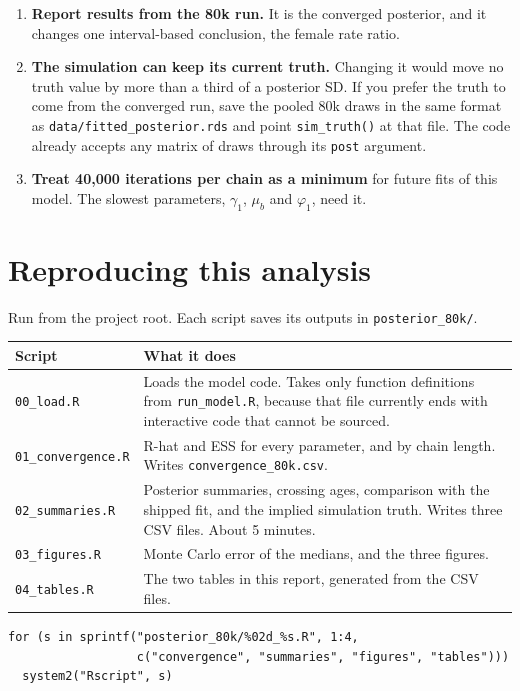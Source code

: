 \documentclass[11pt]{article}
\newcommand{\code}[1]{\texttt{\small #1}}
\begin{document}
\begin{enumerate}
  \item \textbf{Report results from the 80k run.} It is the converged posterior, and it changes one interval-based conclusion, the female rate ratio.
  \item \textbf{The simulation can keep its current truth.} Changing it would move no truth value by more than a third of a posterior SD. If you prefer the truth to come from the converged run, save the pooled 80k draws in the same format as \code{data/fitted\_posterior.rds} and point \code{sim\_truth()} at that file. The code already accepts any matrix of draws through its \code{post} argument.
  \item \textbf{Treat 40,000 iterations per chain as a minimum} for future fits of this model. The slowest parameters, $\gamma_1$, $\mu_b$ and $\varphi_1$, need it.
\end{enumerate}

\section{Reproducing this analysis}

Run from the project root. Each script saves its outputs in \code{posterior\_80k/}.

\begin{center}
\small
\begin{tabularx}{\textwidth}{@{}l X@{}}
\toprule
Script & What it does \\
\midrule
\code{00\_load.R} & Loads the model code. Takes only function definitions from \code{run\_model.R}, because that file currently ends with interactive code that cannot be sourced. \\
\code{01\_convergence.R} & R-hat and ESS for every parameter, and by chain length. Writes \code{convergence\_80k.csv}. \\
\code{02\_summaries.R} & Posterior summaries, crossing ages, comparison with the shipped fit, and the implied simulation truth. Writes three CSV files. About 5 minutes. \\
\code{03\_figures.R} & Monte Carlo error of the medians, and the three figures. \\
\code{04\_tables.R} & The two tables in this report, generated from the CSV files. \\
\bottomrule
\end{tabularx}
\end{center}

\begin{verbatim}
for (s in sprintf("posterior_80k/%02d_%s.R", 1:4,
                  c("convergence", "summaries", "figures", "tables")))
  system2("Rscript", s)
\end{verbatim}
\end{document}
